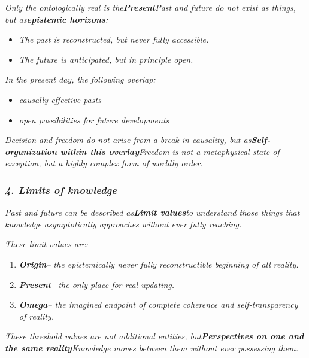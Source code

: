 \documentclass[
]{article}
\begin{document}
\emph{Only the ontologically real is the\textbf{Present}Past and future do not exist as things, but as\textbf{epistemic horizons}:}

\begin{itemize}
\item
  \emph{The past is reconstructed, but never fully accessible.}
\item
  \emph{The future is anticipated, but in principle open.}
\end{itemize}

\emph{In the present day, the following overlap:}

\begin{itemize}
\item
  \emph{causally effective pasts}
\item
  \emph{open possibilities for future developments}
\end{itemize}

\emph{Decision and freedom do not arise from a break in causality, but as\textbf{Self-organization within this overlay}Freedom is not a metaphysical state of exception, but a highly complex form of worldly order.}

\subsubsection{\texorpdfstring{\emph{\textbf{4. Limits of knowledge}}}{4. Limits of knowledge}}\label{limits-of-knowledge}

\emph{Past and future can be described as\textbf{Limit values}to understand those things that knowledge asymptotically approaches without ever fully reaching.}

\emph{These limit values \hspace{0pt}\hspace{0pt}are:}

\begin{enumerate}
\def\labelenumi{\arabic{enumi}.}
\setcounter{enumi}{3}
\item
  \emph{\textbf{Origin}-- the epistemically never fully reconstructible beginning of all reality.}
\item
  \emph{\textbf{Present}-- the only place for real updating.}
\item
  \emph{\textbf{Omega}-- the imagined endpoint of complete coherence and self-transparency of reality.}
\end{enumerate}

\emph{These threshold values \hspace{0pt}\hspace{0pt}are not additional entities, but\textbf{Perspectives on one and the same reality}Knowledge moves between them without ever possessing them.}
\end{document}

